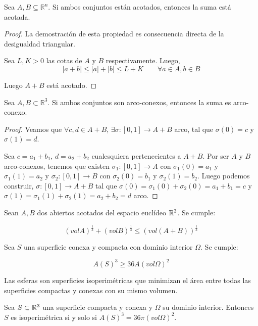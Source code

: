 \begin{lemma}
Sea $A,B \subseteq \mathbb{R}^n$. Si ambos conjuntos están acotados, entonces la suma está acotada.
\end{lemma}
\begin{proof}
La demostración de esta propiedad es consecuencia directa de la desigualdad triangular.

Sea $L,K > 0$ las cotas de $A$ y $B$ respectivamente. Luego,
\begin{equation*}
    |a+b| \leq |a|+|b| \leq L + K \qquad \forall a \in A, b\in B
\end{equation*}

Luego $A+B$ está acotado.
\end{proof}


\begin{lemma}
Sea $A,B \subset \mathbb{R}^3$. Si ambos conjuntos son arco-conexos, entonces la suma es arco-conexo.
\end{lemma}
\begin{proof}
Veamos que $\forall c,d \in A+B$, $\exists \sigma: [0,1] \longrightarrow A+B$ arco, tal que $\sigma(0)=c$ y $\sigma(1)=d$.

Sea $c=a_1 + b_1$, $d=a_2+b_2$ cualesquiera pertenecientes a $A+B$. Por ser $A$ y $B$ arco-conexos, tenemos que existen $\sigma_1: [0,1] \longrightarrow A$ con $\sigma_1(0)=a_1$ y $\sigma_1(1)=a_2$ y $\sigma_2: [0,1] \longrightarrow B$ con $\sigma_2(0)=b_1$ y $\sigma_2(1)=b_2$. Luego podemos construir, $\sigma: [0,1] \longrightarrow A+B$ tal que $\sigma(0)=\sigma_1(0) + \sigma_2(0) = a_1+b_1 = c$ y $\sigma(1)=\sigma_1(1) + \sigma_2(1) = a_2+b_2 = d$ arco.
\end{proof}

\begin{theorem}
Sean $A, B$ dos abiertos acotados del espacio euclídeo $\mathbb{R}^3$. Se cumple:

\begin{equation*}
    (vol A)^{\frac{1}{3}} + (vol B)^{\frac{1}{3}} \leq (vol (A+B))^{\frac{1}{3}}
\end{equation*}
\end{theorem}

\begin{theorem}
Sea $S$ una superficie conexa y compacta con dominio interior $\Omega$. Se cumple:

\begin{equation*}
    A(S)^3 \geq 36A(vol\Omega)^2
\end{equation*}
\end{theorem}

\begin{proposition}
Las esferas son superficies isoperimétricas que minimizan el área entre todas las superficies compactas y conexas con su mismo volumen.
\end{proposition}

\begin{corolario}
Sea $S \subset \mathbb{R}^3$ una superficie compacta y conexa y $\Omega$ su dominio interior. Entonces $S$ es isoperimétrica si y solo si $A(S)^3 = 36\pi (vol \Omega)^2$.
\end{corolario}
